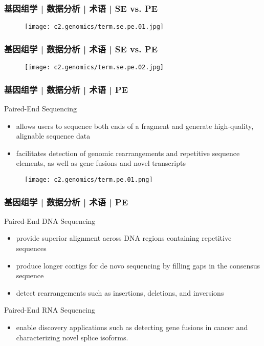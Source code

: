 \begin{frame}
  \frametitle{基因组学 | 数据分析 | 术语 | SE vs. PE}
  \begin{figure}
    \centering
    \texttt{[image: c2.genomics/term.se.pe.01.jpg]}
  \end{figure}
\end{frame}

\begin{frame}
  \frametitle{基因组学 | 数据分析 | 术语 | SE vs. PE}
  \begin{figure}
    \centering
    \texttt{[image: c2.genomics/term.se.pe.02.jpg]}
  \end{figure}
\end{frame}

\begin{frame}
  \frametitle{基因组学 | 数据分析 | 术语 | PE}
  \begin{block}{Paired-End Sequencing}
    \begin{itemize}
      \item allows users to sequence both ends of a fragment and generate high-quality, alignable sequence data
      \item facilitates detection of genomic rearrangements and repetitive sequence elements, as well as gene fusions and novel transcripts
    \end{itemize}
  \end{block}
  \begin{figure}
    \centering
    \texttt{[image: c2.genomics/term.pe.01.png]}
  \end{figure}
\end{frame}

\begin{frame}
  \frametitle{基因组学 | 数据分析 | 术语 | PE}
  \begin{block}{Paired-End DNA Sequencing}
    \begin{itemize}
      \item provide superior alignment across DNA regions containing repetitive sequences
      \item produce longer contigs for de novo sequencing by filling gaps in the consensus sequence
      \item detect rearrangements such as insertions, deletions, and inversions
    \end{itemize}
  \end{block}
  \pause
  \begin{block}{Paired-End RNA Sequencing}
    \begin{itemize}
      \item enable discovery applications such as detecting gene fusions in cancer and characterizing novel splice isoforms.
    \end{itemize}
  \end{block}
\end{frame}

